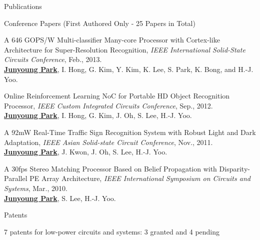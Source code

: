 \documentclass{resume} %
\begin{document}
\begin{section}{Publications}
\begin{subsection}{Conference Papers (First Authored Only - 25 Papers in Total)}{}{}{}
\item A 646 GOPS/W Multi-classifier Many-core Processor with Cortex-like Architecture for Super-Resolution Recognition, \emph{IEEE International Solid-State Circuits Conference}, Feb., 2013. \\
{\small \underline{\bf Junyoung Park}, I. Hong, G. Kim, Y. Kim, K. Lee, S. Park, K. Bong, and H.-J. Yoo.}

\item Online Reinforcement Learning NoC for Portable HD Object Recognition Processor, \emph{IEEE Custom Integrated Circuits Conference}, Sep., 2012. \\
{\small \underline{\bf Junyoung Park}, I. Hong, G. Kim, J. Oh, S. Lee, H.-J. Yoo.}

\item A 92mW Real-Time Traffic Sign Recognition System with Robust Light and Dark Adaptation, \emph{IEEE Asian Solid-state Circuit Conference}, Nov., 2011. \\
{\small \underline{\bf Junyoung Park}, J. Kwon, J. Oh, S. Lee, H.-J. Yoo.}

\item A 30fps Stereo Matching Processor Based on Belief Propagation with Disparity-Parallel PE Array Architecture, \emph{IEEE International Symposium on Circuits and Systems}, Mar., 2010. \\
{\small \underline{\bf Junyoung Park}, S. Lee, H.-J. Yoo.}

\end{subsection}

\begin{subsection}{Patents}{}{}{}
\item 7 patents for low-power circuits and systems: 3 granted and 4 pending
\end{subsection}

\end{section}



\end{document}

